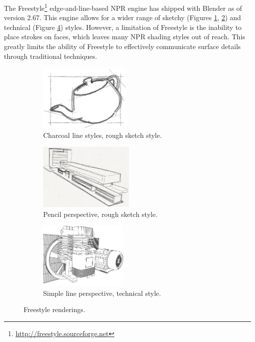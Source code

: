 The Freestyle\footnote{\url{http://freestyle.sourceforge.net}} edge-and-line-based NPR engine has shipped with Blender as of version 2.67. This engine allows for a wider range of sketchy (Figures \ref{ex_sketchy1}, \ref{ex_sketchy2}) and technical (Figure \ref{ex_line}) styles. However, a limitation of Freestyle is the inability to place strokes on faces, which leaves many NPR shading styles out of reach. This greatly limits the ability of Freestyle to effectively communicate surface details through traditional techniques.

\begin{figure}[h]
	\centering
	\begin{subfigure}[b]{0.3\textwidth}
		\includegraphics[height=3.25cm]{images/ex_sketchy1}
		\caption{Charcoal line styles, rough sketch style.}\label{ex_sketchy1}
	\end{subfigure}
	\begin{subfigure}[b]{0.3\textwidth}
		\includegraphics[height=3.25cm]{images/ex_sketchy2}
		\caption{Pencil perspective, rough sketch style.}\label{ex_sketchy2}
	\end{subfigure}
	\begin{subfigure}[b]{0.3\textwidth}
		\includegraphics[height=3.25cm]{images/ex_line}
		\caption{Simple line perspective, technical style.}\label{ex_line}
	\end{subfigure}
	\caption{Freestyle renderings.}
\end{figure}

